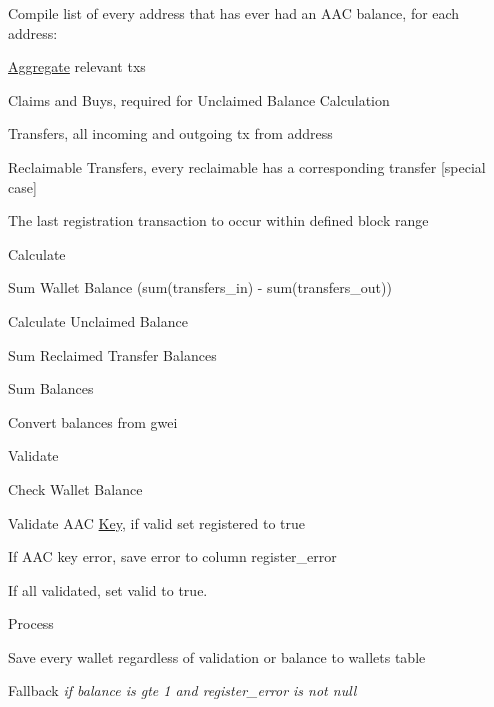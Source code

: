\begin{DoxyEnumerate}
\item Compile list of every address that has ever had an A\+AC balance, for each address\+:
\begin{DoxyEnumerate}
\item \mbox{\hyperlink{struct_aggregate}{Aggregate}} relevant txs
\begin{DoxyEnumerate}
\item Claims and Buys, required for Unclaimed Balance Calculation
\item Transfers, all incoming and outgoing tx from address
\item Reclaimable Transfers, every reclaimable has a corresponding transfer \mbox{[}special case\mbox{]}
\item The last registration transaction to occur within defined block range
\end{DoxyEnumerate}
\item Calculate
\begin{DoxyEnumerate}
\item Sum Wallet Balance (sum(transfers\+\_\+in) -\/ sum(transfers\+\_\+out))
\item Calculate Unclaimed Balance
\item Sum Reclaimed Transfer Balances
\item Sum Balances
\item Convert balances from gwei
\end{DoxyEnumerate}
\item Validate
\begin{DoxyEnumerate}
\item Check Wallet Balance
\item Validate A\+AC \mbox{\hyperlink{struct_key}{Key}}, if valid set {\ttfamily registered} to {\ttfamily true}
\item If A\+AC key error, save error to column {\ttfamily register\+\_\+error}
\item If all validated, set {\ttfamily valid} to true.
\end{DoxyEnumerate}
\item Process
\begin{DoxyEnumerate}
\item Save every wallet regardless of validation or balance to {\ttfamily wallets} table
\end{DoxyEnumerate}
\item Fallback {\itshape if {\ttfamily balance is gte 1} and {\ttfamily register\+\_\+error is not null}}
\begin{DoxyEnumerate}

\end{DoxyEnumerate}
\end{DoxyEnumerate}
\end{DoxyEnumerate}
